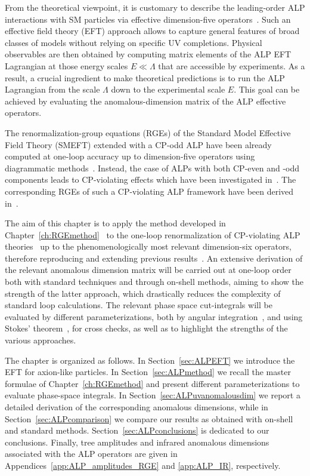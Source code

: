 From the theoretical viewpoint, it is customary to describe the leading-order ALP interactions with
SM particles via effective dimension-five operators~\cite{Georgi:1986df}. Such an effective field
theory (EFT) approach allows to capture general features of broad classes of models without relying
on specific UV completions. Physical observables are then obtained by computing matrix
elements of the ALP EFT Lagrangian at those energy scales $E \ll \Lambda$ that are accessible by
experiments. As a result, a crucial ingredient to make theoretical predictions is to run the ALP
Lagrangian from the scale $\Lambda$ down to the experimental scale $E$. This goal can be achieved by
evaluating the anomalous-dimension matrix of the ALP effective operators.

The renormalization-group equations (RGEs) of the Standard Model Effective Field Theory (SMEFT) extended with a CP-odd ALP have
been already computed at one-loop accuracy up to dimension-five operators using diagrammatic
methods~\cite{Bauer:2020jbp,Chala:2020wvs}. Instead, the case of ALPs with both CP-even and -odd
components leads to CP-violating effects which have been investigated
in~\cite{Marciano:2016yhf,DiLuzio:2020oah}. The corresponding RGEs of such a CP-violating ALP
framework have been derived in~\cite{DasBakshi:2023lca}.

The aim of this chapter is to apply the method developed in
Chapter~\ref{ch:RGEmethod}~\cite{Caron-Huot:2016cwu,Bresciani:2023jsu} to the one-loop
renormalization of CP-violating ALP theories~\cite{Marciano:2016yhf,DiLuzio:2020oah} up to the
phenomenologically most relevant dimension-six operators, therefore reproducing and extending
previous results~\cite{DasBakshi:2023lca}. An extensive derivation of the relevant anomalous
dimension matrix will be carried out at one-loop order both with standard techniques and through
on-shell methods, aiming to show the strength of the latter approach, which drastically reduces the
complexity of standard loop calculations. The relevant phase space cut-integrals will be evaluated by
different parameterizations, both by angular
integration~\cite{Zwiebel:2011bx,Caron-Huot:2016cwu,EliasMiro:2020tdv,Baratella:2020lzz,%
Bern:2020ikv,Baratella:2020dvw}, and using Stokes'
theorem~\cite{Mastrolia:2009dr,Jiang:2020mhe,Shu:2021qlr,Baratella:2021guc}, for cross checks, as
well as to highlight the strengths of the various approaches.

The chapter is organized as follows. In Section~\ref{sec:ALPEFT} we introduce the EFT for axion-like
particles. In Section~\ref{sec:ALPmethod} we recall the master formulae of
Chapter~\ref{ch:RGEmethod} and present different parameterizations to evaluate phase-space integrals.
In Section~\ref{sec:ALPuvanomalousdim} we report a detailed derivation of the corresponding anomalous
dimensions, while in Section~\ref{sec:ALPcomparison} we compare our results as obtained with on-shell
and standard methods. Section~\ref{sec:ALPconclusions} is dedicated to our conclusions. Finally, tree
amplitudes and infrared anomalous dimensions associated with the ALP operators are given in
Appendices~\ref{app:ALP_amplitudes_RGE} and \ref{app:ALP_IR}, respectively.

